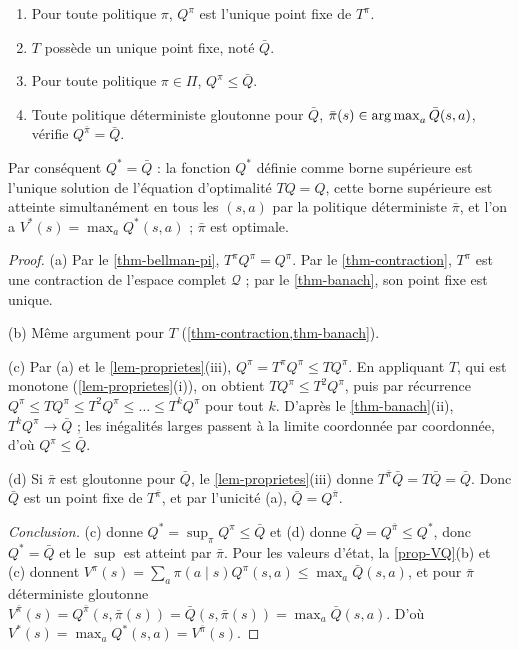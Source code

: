 \begin{theoreme}\label{thm-optimalite}
\begin{enumerate}[label=(\alph*)]
\item Pour toute politique $\pi$, $Q^\pi$ est l'unique point fixe de $T^\pi$.
\item $T$ possède un unique point fixe, noté $\bar Q$.
\item Pour toute politique $\pi\in\Pi$, $Q^\pi\le\bar Q$.
\item Toute politique déterministe gloutonne pour $\bar Q$, $\bar\pi(s)\in\operatorname*{arg\,max}_a\bar Q(s,a)$, vérifie $Q^{\bar\pi}=\bar Q$.
\end{enumerate}
Par conséquent $Q^*=\bar Q$ : la fonction $Q^*$ définie comme borne supérieure est l'unique solution de l'équation d'optimalité $TQ=Q$, cette borne supérieure est atteinte simultanément en tous les $(s,a)$ par la politique déterministe $\bar\pi$, et l'on a $V^*(s)=\max_aQ^*(s,a)$ ; $\bar\pi$ est optimale.
\end{theoreme}
\begin{proof}
(a) Par le \cref{thm-bellman-pi}, $T^\pi Q^\pi=Q^\pi$. Par le \cref{thm-contraction}, $T^\pi$ est une contraction de l'espace complet $\mathcal Q$ ; par le \cref{thm-banach}, son point fixe est unique.

(b) Même argument pour $T$ (\cref{thm-contraction,thm-banach}).

(c) Par (a) et le \cref{lem-proprietes}(iii), $Q^\pi=T^\pi Q^\pi\le TQ^\pi$. En appliquant $T$, qui est monotone (\cref{lem-proprietes}(i)), on obtient $TQ^\pi\le T^2Q^\pi$, puis par récurrence $Q^\pi\le TQ^\pi\le T^2Q^\pi\le\dots\le T^kQ^\pi$ pour tout $k$. D'après le \cref{thm-banach}(ii), $T^kQ^\pi\to\bar Q$ ; les inégalités larges passent à la limite coordonnée par coordonnée, d'où $Q^\pi\le\bar Q$.

(d) Si $\bar\pi$ est gloutonne pour $\bar Q$, le \cref{lem-proprietes}(iii) donne $T^{\bar\pi}\bar Q=T\bar Q=\bar Q$. Donc $\bar Q$ est un point fixe de $T^{\bar\pi}$, et par l'unicité (a), $\bar Q=Q^{\bar\pi}$.

\emph{Conclusion.} (c) donne $Q^*=\sup_\pi Q^\pi\le\bar Q$ et (d) donne $\bar Q=Q^{\bar\pi}\le Q^*$, donc $Q^*=\bar Q$ et le $\sup$ est atteint par $\bar\pi$. Pour les valeurs d'état, la \cref{prop-VQ}(b) et (c) donnent $V^\pi(s)=\sum_a\pi(a\mid s)Q^\pi(s,a)\le\max_a\bar Q(s,a)$, et pour $\bar\pi$ déterministe gloutonne $V^{\bar\pi}(s)=Q^{\bar\pi}(s,\bar\pi(s))=\bar Q(s,\bar\pi(s))=\max_a\bar Q(s,a)$. D'où $V^*(s)=\max_aQ^*(s,a)=V^{\bar\pi}(s)$.
\end{proof}

